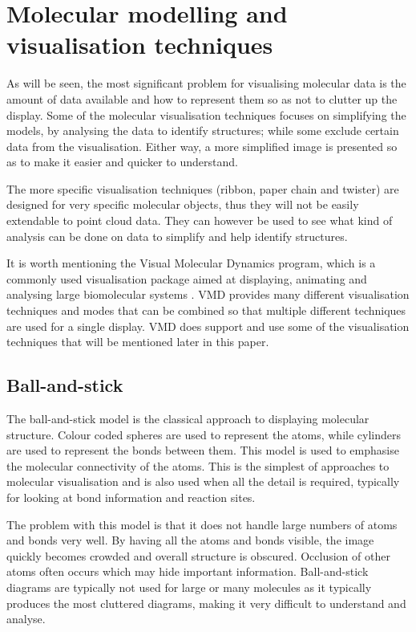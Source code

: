 \documentclass[a4paper]{article}
\begin{document}
\section{Molecular modelling and visualisation techniques}

As will be seen, the most significant problem for visualising molecular data is
the amount of data available and how to represent them so as not to clutter up
the display. Some of the molecular visualisation techniques focuses on
simplifying the models, by analysing the data to identify structures; while some
exclude certain data from the visualisation. Either way, a more simplified image
is presented so as to make it easier and quicker to understand.

The more specific visualisation techniques (ribbon, paper chain and twister) are
designed for very specific molecular objects, thus they will not be easily
extendable to point cloud data. They can however be used to see what kind of
analysis can be done on data to simplify and help identify structures.

It is worth mentioning the Visual Molecular Dynamics \citep{humphrey96} program,
which is a commonly used visualisation package aimed at displaying, animating
and analysing large biomolecular systems \citep{VMD}. VMD provides many
different visualisation techniques and modes that can be combined so that
multiple different techniques are used for a single display. VMD does support
and use some of the visualisation techniques that will be mentioned later in
this paper.

\subsection*{Ball-and-stick}
The ball-and-stick model is the classical approach to displaying molecular
structure. Colour coded spheres are used to represent the atoms, while cylinders
are used to represent the bonds between them. This model is used to emphasise
the molecular connectivity of the atoms. This is the simplest of approaches to
molecular visualisation and is also used when all the detail is required,
typically for looking at bond information and reaction sites.

The problem with this model is that it does not handle large numbers of atoms
and bonds very well. By having all the atoms and bonds visible, the image
quickly becomes crowded and overall structure is obscured. Occlusion of other
atoms often occurs which may hide important information. Ball-and-stick diagrams
are typically not used for large or many molecules as it typically produces the
most cluttered diagrams, making it very difficult to understand and analyse.
\end{document}
